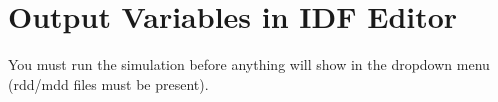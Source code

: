 \section{Output Variables in IDF Editor}\label{output-variables-in-idf-editor}

You must run the simulation before anything will show in the dropdown menu (rdd/mdd files must be present).
